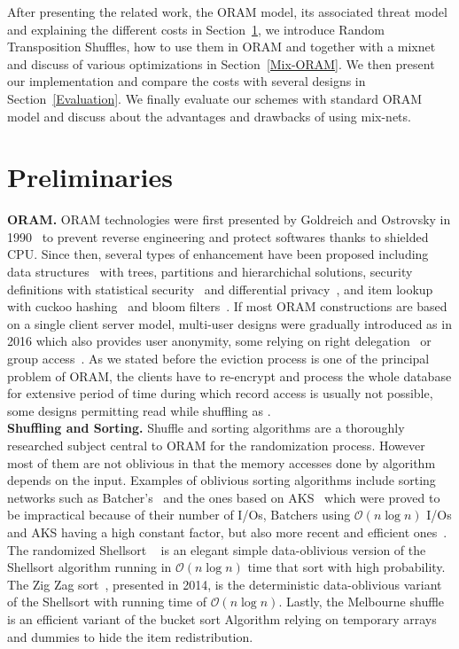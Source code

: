 \documentclass{llncs}
\begin{document}
After presenting the related work, the ORAM model, its associated threat model and explaining the different costs in Section~\ref{Prelim}, we introduce Random Transposition Shuffles, how to use them in ORAM and together with a mixnet and discuss of various optimizations in Section~\ref{Mix-ORAM}. We then present our implementation and compare the costs with several designs in Section~\ref{Evaluation}.
We finally evaluate our schemes with standard ORAM model and discuss about the advantages and drawbacks of using mix-nets.
%
\section{Preliminaries}\label{Prelim}
%
\noindent\textbf{ORAM.}
ORAM technologies were first presented by Goldreich and Ostrovsky in 1990~\cite{ostrovsky1990efficient} to prevent reverse engineering and protect softwares thanks to shielded CPU.
Since then, several types of enhancement have been proposed including data structures~\cite{goldreich1996software,stefanov2011towards,stefanov2013path,ren2014ring} with trees, partitions and hierarchichal solutions,
security definitions with statistical security~\cite{damgaard2011perfectly,ajtai2010oblivious} and differential privacy~\cite{wagh2016root}, and item lookup with cuckoo hashing~\cite{pinkas2010oblivious} and bloom filters~\cite{williams2008building}.
If most ORAM constructions are based on a single client server model, multi-user designs were gradually introduced as \cite{backesanonymous} in 2016 which also provides user anonymity, some relying on right delegation~\cite{franz2011oblivious} or group access~\cite{goodrich2012privacy}.
As we stated before the eviction process is one of the principal problem of ORAM, the clients have to re-encrypt and process the whole database for extensive period of time during which record access is usually not possible, some designs permitting read while shuffling as \cite{boneh2011}.\\

\noindent\textbf{Shuffling and Sorting.}
Shuffle and sorting algorithms are a thoroughly researched subject central to ORAM for the randomization process. However most of them are not oblivious in that the memory accesses done by algorithm depends on the input.
Examples of oblivious sorting algorithms include sorting networks such as Batcher's~\cite{batcher1968sorting} and the ones based on AKS~\cite{ajtai19830} which were proved to be impractical because of their number of I/Os, Batchers using $\mathcal{O}\left ( n \log n \right)$ I/Os and AKS having a high constant factor, but also more recent and efficient ones~\cite{paterson1990improved}.
The randomized Shellsort ~\cite{goodrich2010randomized} is an elegant simple data-oblivious version of the Shellsort algorithm running in $\mathcal{O}\left ( n \log n \right)$ time that sort with high probability.
The Zig Zag sort~\cite{goodrich2014zig}, presented in 2014, is the deterministic data-oblivious variant of the Shellsort with running time of $\mathcal{O}\left ( n \log n\right)$.
Lastly, the Melbourne shuffle~\cite{ohrimenko2014melbourne} is an efficient variant of the bucket sort Algorithm relying on temporary arrays and dummies to hide the item redistribution.\\
\end{document}
